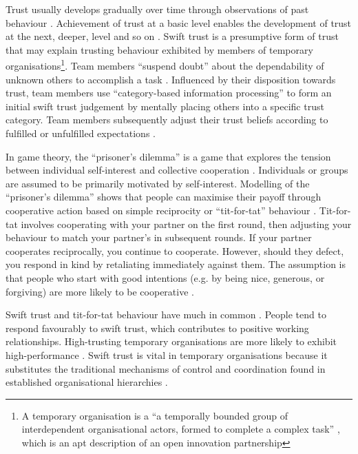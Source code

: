 Trust usually develops gradually over time through observations of past behaviour \citep{mayer1995integrative}. Achievement of trust at a basic level enables the development of trust at the next, deeper, level and so on \citep{robert2009individual}. Swift trust is a presumptive form of trust that may explain trusting behaviour exhibited by members of temporary organisations\footnote{A temporary organisation is a \enquote{a temporally bounded group of interdependent organisational actors, formed to complete a complex task} \citep{burke2016temporary}, which is an apt description of an open innovation partnership}. Team members \enquote{suspend doubt} about the dependability of unknown others to accomplish a task \citep{germain2014role}. Influenced by their disposition towards trust, team members use \enquote{category-based information processing} to form an initial swift trust judgement by mentally placing others into a specific trust category. Team members subsequently adjust their trust beliefs according to fulfilled or unfulfilled expectations \citep{meyerson1996swift,robert2009individual}. \medskip

In game theory, the \enquote{prisoner's dilemma} is a game that explores the tension between individual self-interest and collective cooperation \citep{richards2001reciprocity}. Individuals or groups are assumed to be primarily motivated by self-interest. Modelling of the \enquote{prisoner's dilemma} shows that people can maximise their payoff through cooperative action based on simple reciprocity or \enquote{tit-for-tat} behaviour \citep{axelrod1980effective,axelrod1981evolution}. Tit-for-tat involves cooperating with your partner on the first round, then adjusting your behaviour to match your partner's in subsequent rounds. If your partner cooperates reciprocally, you continue to cooperate. However, should they defect, you respond in kind by retaliating immediately against them. The assumption is that people who start with good intentions (e.g. by being nice, generous, or forgiving) are more likely to be cooperative \citep{blais1987epistemic,richards2001reciprocity, segal2007tit, fulmer2013trust}. \medskip

Swift trust and tit-for-tat behaviour have much in common \citep{fulmer2013trust}. People tend to respond favourably to swift trust, which contributes to positive working relationships. High-trusting temporary organisations are more likely to exhibit high-performance \citep{ashleigh2007trust}. Swift trust is vital in temporary organisations because it substitutes the traditional mechanisms of control and coordination found in established organisational hierarchies \citep{kasper2001communicating}. \medskip

